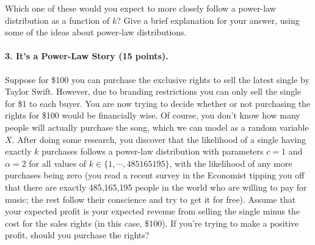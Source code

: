 \documentclass[11pt]{article} %
\begin{document}
Which one of these would you expect to more closely follow a power-law distribution
as a function of $k$? Give a brief explanation for your answer, using some of the
ideas about power-law distributions.

\paragraph{3. It's a Power-Law Story (15 points).}
Suppose for \$100 you can purchase the exclusive rights to sell the latest single by Taylor Swift. However, due to branding restrictions you can only sell the single for \$1 to each buyer. You are now trying to decide whether or not purchasing the rights for \$100 would be financially wise. Of course, you don't know how many people will actually purchase the song, which we can model as a random variable $X$. After doing some research, you discover that the likelihood of a single having exactly $k$ purchases follows a power-law distribution with parameters $c=1$ and $\alpha=2$ for all values of $k \in \{1, \cdots, 485165195\}$, with the likelihood of any more purchases being zero (you read a recent survey in the Economist tipping you off that there are exactly 485,165,195 people in the world who are willing to pay for music; the rest follow their conscience and try to get it for free). Assume that your expected profit is your expected revenue from selling the single minus the cost for the sales rights (in this case, \$100). If you're trying to make a positive profit, should you purchase the rights?
\end{document}
